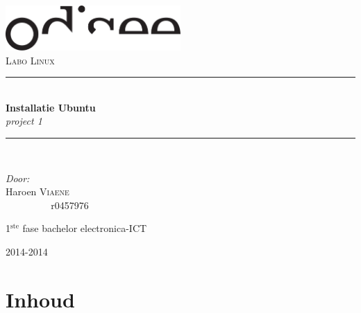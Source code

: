 \documentclass[11pt, a4paper]{article}
\newcommand{\HRule}{\rule{\linewidth}{0.5mm}}
\begin{document}
\begin{titlepage}
\begin{center}
\includegraphics[width=0.5\textwidth]{./IMG/logo}~\\[1cm]



\textsc{\Large Labo Linux}\\[0.5cm]


\HRule \\[0.4cm]
{ \LARGE \bfseries Installatie Ubuntu}\\[0.4cm]
{\large \em{project 1}}\\[0.2cm]




\HRule \\[1.5cm]

\begin{minipage}{0.4\textwidth}
\begin{flushleft} \large
\emph{Door:}\\
Haroen \textsc{Viaene}\\
\ \ \ \ \ \ \ \ \ \,r0457976\\
\end{flushleft}
\end{minipage}
\begin{minipage}{0.4\textwidth}
\begin{flushright} \large
\large{1$^{\text{ste}}$ fase bachelor electronica-ICT}\\
\end{flushright}
\end{minipage}





\vfill

{\large 2014-2014}



\end{center}
\end{titlepage}







\newpage


\section{Inhoud}
\tableofcontents
\end{document}
